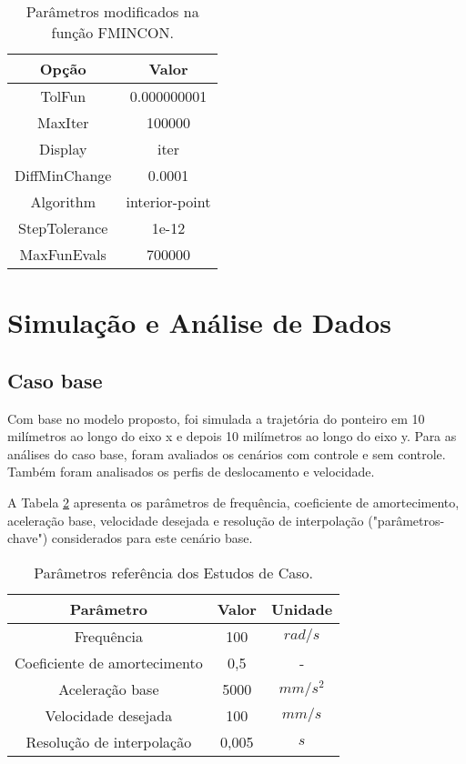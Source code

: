 \begin{table}
    \begin{center}
    \caption{Parâmetros modificados na função FMINCON.}
    \label{tab:fmincon_options}
    \begin{tabular}{c c}
        Opção & Valor \\ \hline
        TolFun & 0.000000001 \\
        MaxIter & 100000 \\
        Display & iter \\
        DiffMinChange & 0.0001 \\
        Algorithm & interior-point \\
        StepTolerance & 1e-12 \\
        MaxFunEvals & 700000  \\ \hline
    \end{tabular}
    \end{center}
\end{table}

\section{Simulação e Análise de Dados}

\subsection{Caso base} 

Com base no modelo proposto, foi simulada a trajetória do ponteiro em 10 milímetros ao longo do eixo x e depois 10 milímetros ao longo do eixo y. Para as análises do caso base, foram avaliados os cenários com controle e sem controle. Também foram analisados os perfis de deslocamento e velocidade. 

A Tabela \ref{tab:base_params} apresenta os parâmetros de frequência, coeficiente de amortecimento, aceleração base, velocidade desejada e resolução de interpolação ("parâmetros-chave") considerados para este cenário base.

\begin{table}
    \begin{center}
    \caption{Parâmetros referência dos Estudos de Caso.}
    \label{tab:base_params}
    \begin{tabular}{c c c}
        Parâmetro & Valor & Unidade\\ \hline
        Frequência & 100 & $rad/s$\\
        Coeficiente de amortecimento & 0,5 & - \\
        Aceleração base & 5000 & $mm/s^2$ \\
        Velocidade desejada & 100 & $mm/s$ \\
        Resolução de interpolação & 0,005 & $s$ \\ \hline
    \end{tabular}
    \end{center}
\end{table}

